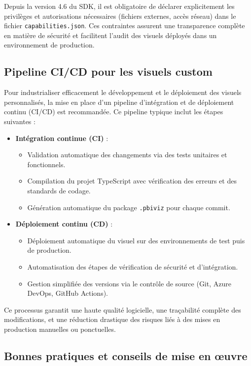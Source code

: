 Depuis la version 4.6 du SDK, il est obligatoire de déclarer explicitement les privilèges et autorisations nécessaires (fichiers externes, accès réseau) dans le fichier \texttt{capabilities.json}. Ces contraintes assurent une transparence complète en matière de sécurité et facilitent l'audit des visuels déployés dans un environnement de production.

\subsection{Pipeline CI/CD pour les visuels custom}

Pour industrialiser efficacement le développement et le déploiement des visuels personnalisés, la mise en place d’un pipeline d’intégration et de déploiement continu (CI/CD) est recommandée. Ce pipeline typique inclut les étapes suivantes :
\begin{itemize}
  \item \textbf{Intégration continue (CI)} :
  \begin{itemize}
    \item Validation automatique des changements via des tests unitaires et fonctionnels.
    \item Compilation du projet TypeScript avec vérification des erreurs et des standards de codage.
    \item Génération automatique du package \texttt{.pbiviz} pour chaque commit.
  \end{itemize}
  \item \textbf{Déploiement continu (CD)} :
  \begin{itemize}
    \item Déploiement automatique du visuel sur des environnements de test puis de production.
    \item Automatisation des étapes de vérification de sécurité et d'intégration.
    \item Gestion simplifiée des versions via le contrôle de source (Git, Azure DevOps, GitHub Actions).
  \end{itemize}
\end{itemize}

Ce processus garantit une haute qualité logicielle, une traçabilité complète des modifications, et une réduction drastique des risques liés à des mises en production manuelles ou ponctuelles.

\subsection{Bonnes pratiques et conseils de mise en œuvre}


